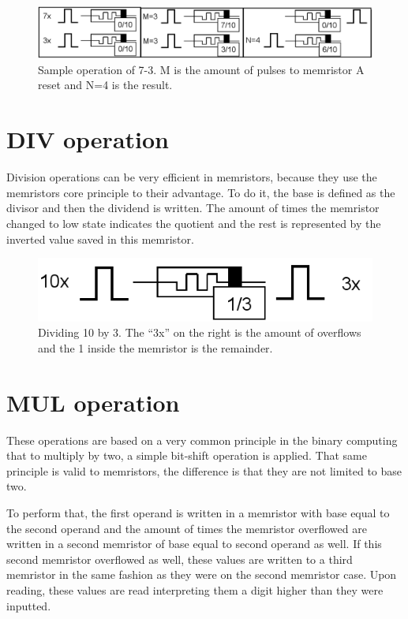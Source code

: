 \documentclass[ecp,tc,english]{iiufrgs}
\begin{document}
\begin{figure}
  \caption{Sample operation of 7-3. M is the amount of pulses to memristor A reset and N=4 is the result.}
  \centerline{\includegraphics{fig/basicsub.png}}
  \label{fig:basicsub}
\end{figure}

\section{DIV operation}

Division operations can be very efficient in memristors, because they use the memristors core principle to their advantage. To do it, the base is defined as the divisor and then the dividend is written. The amount of times the memristor changed to low state indicates the quotient and the rest is represented by the inverted value saved in this memristor.

\begin{figure}
  \caption{Dividing 10 by 3. The “3x” on the right is the amount of overflows and the 1 inside the memristor is the remainder.}
  \centerline{\includegraphics{fig/basicdiv.png}}
  \label{fig:basicdiv}
\end{figure}

\section{MUL operation}

These operations are based on a very common principle in the binary computing that to multiply by two, a simple bit-shift operation is applied. That same principle is valid to memristors, the difference is that they are not limited to base two.

To perform that, the first operand is written in a memristor with base equal to the second operand and the amount of times the memristor overflowed are written in a second memristor of base equal to second operand as well. If this second memristor overflowed as well, these values are written to a third memristor in the same fashion as they were on the second memristor case. Upon reading, these values are read interpreting them a digit higher than they were inputted.
\end{document}
